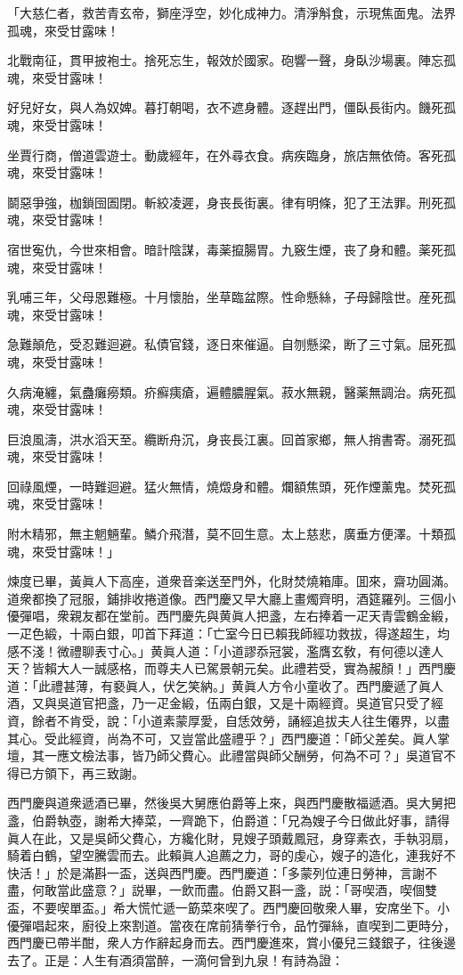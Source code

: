 \begin{myquote}
「大慈仁者，救苦青玄帝，獅座浮空，妙化成神力。清淨斛食，示現焦面鬼。法界孤魂，來受甘露味！　

北戰南征，貫甲披袍士。捨死忘生，報效於國家。砲響一聲，身臥沙場裏。陣忘孤魂，來受甘露味！

好兒好女，與人為奴婢。暮打朝喝，衣不遮身體。逐趕出門，僵臥長街内。饑死孤魂，來受甘露味！

坐賈行商，僧道雲遊士。動歲經年，在外尋衣食。病疾臨身，旅店無依倚。客死孤魂，來受甘露味！

鬬惡爭強，枷鎖囹圄閉。斬絞凌遲，身丧長街裏。律有明條，犯了王法罪。刑死孤魂，來受甘露味！

宿世寃仇，今世來相會。暗計陰謀，毒薬攛腸胃。九竅生煙，丧了身和體。薬死孤魂，來受甘露味！

乳哺三年，父母恩難極。十月懷胎，坐草臨盆際。性命懸絲，子母歸陰世。産死孤魂，來受甘露味！

急難顛危，受忍難迴避。私債官錢，逐日來催逼。自刎懸梁，断了三寸氣。屈死孤魂，來受甘露味！

久病淹纏，氣蠱癱癆類。疥癬痍瘡，遍體膿腥氣。菽水無親，醫薬無調治。病死孤魂，來受甘露味！

巨浪風濤，洪水滔天至。纜断舟沉，身丧長江裏。回首家鄉，無人捎書寄。溺死孤魂，來受甘露味！

回祿風煙，一時難迴避。猛火無情，燒燬身和體。爛額焦頭，死作煙薰鬼。焚死孤魂，來受甘露味！

附木精邪，無主魍魎輩。鱗介飛潛，莫不回生意。太上慈悲，廣垂方便澤。十類孤魂，來受甘露味！」
\end{myquote}

煉度已畢，黃眞人下高座，道衆音楽送至門外，化財焚燒箱庫。囬來，齋功圓滿。道衆都換了冠服，鋪排收捲道像。西門慶又早大廳上畫燭齊明，酒筵羅列。三個小優彈唱，衆親友都在堂前。西門慶先與黄眞人把盞，左右捧着一疋天青雲鶴金緞，一疋色緞，十兩白銀，叩首下拜道：「亡室今日已賴我師經功救拔，得遂超生，均感不淺！微禮聊表寸心。」黄眞人道：「小道謬忝冠裳，濫膺玄敎，有何德以達人天？皆賴大人一誠感格，而尊夫人已駕景朝元矣。此禮若受，實為赧顏！」西門慶道：「此禮甚薄，有褻眞人，伏乞笑納。」黄眞人方令小童收了。西門慶遞了眞人酒，又與吳道官把盞，乃一疋金緞，伍兩白銀，又是十兩經資。吳道官只受了經資，餘者不肯受，說：「小道素蒙厚愛，自恁效勞，誦經追拔夫人往生僊界，以盡其心。受此經資，尚為不可，又豈當此盛禮乎？」西門慶道：「師父差矣。眞人掌壇，其一應文檢法事，皆乃師父費心。此禮當與師父酬勞，何為不可？」吳道官不得已方領下，再三致謝。

西門慶與道衆遞酒已畢，然後吳大舅應伯爵等上來，與西門慶散福遞酒。吳大舅把盞，伯爵執壺，謝希大捧菜，一齊跪下，伯爵道：「兄為嫂子今日做此好事，請得眞人在此，又是吳師父費心，方纔化財，見嫂子頭戴鳳冠，身穿素衣，手執羽扇，騎着白鶴，望空騰雲而去。此賴眞人追薦之力，哥的虔心，嫂子的造化，連我好不快活！」於是滿斟一盃，送與西門慶。西門慶道：「多蒙列位連日勞神，言謝不盡，何敢當此盛意？」説畢，一飲而盡。伯爵又斟一盞，説：「哥喫酒，喫個雙盃，不要喫單盃。」希大慌忙遞一筯菜來喫了。西門慶回敬衆人畢，安席坐下。小優彈唱起來，廚役上來割道。當夜在席前猜拳行令，品竹彈絲，直喫到二更時分，西門慶已帶半酣，衆人方作辭起身而去。西門慶進來，賞小優兒三錢銀子，往後邊去了。正是：人生有酒須當醉，一滴何曾到九泉！有詩為證：

